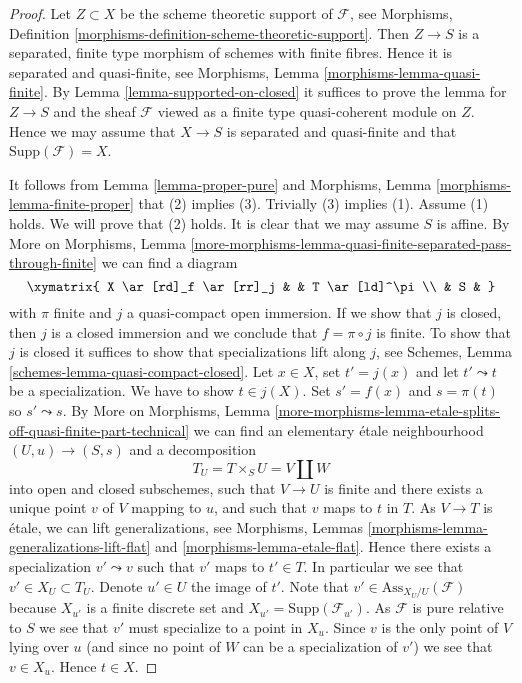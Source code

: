 \begin{proof}
Let $Z \subset X$ be the scheme theoretic support of $\mathcal{F}$, see
Morphisms, Definition \ref{morphisms-definition-scheme-theoretic-support}.
Then $Z \to S$ is a separated, finite type morphism of schemes with
finite fibres. Hence it is separated and quasi-finite, see
Morphisms, Lemma \ref{morphisms-lemma-quasi-finite}.
By
Lemma \ref{lemma-supported-on-closed}
it suffices to prove the lemma for $Z \to S$ and the sheaf $\mathcal{F}$
viewed as a finite type quasi-coherent module on $Z$. Hence we may
assume that $X \to S$ is separated and quasi-finite and that
$\text{Supp}(\mathcal{F}) = X$.

\medskip\noindent
It follows from
Lemma \ref{lemma-proper-pure}
and
Morphisms, Lemma \ref{morphisms-lemma-finite-proper}
that (2) implies (3). Trivially (3) implies (1). Assume (1) holds.
We will prove that (2) holds. It is clear that we may assume $S$ is affine. By
More on Morphisms,
Lemma \ref{more-morphisms-lemma-quasi-finite-separated-pass-through-finite}
we can find a diagram
$$
\xymatrix{
X \ar[rd]_f \ar[rr]_j & & T \ar[ld]^\pi \\
& S &
}
$$
with $\pi$ finite and $j$ a quasi-compact open immersion.
If we show that $j$ is closed, then $j$ is a closed immersion
and we conclude that $f = \pi \circ j$ is finite.
To show that $j$ is closed it suffices to show that specializations
lift along $j$, see
Schemes, Lemma \ref{schemes-lemma-quasi-compact-closed}.
Let $x \in X$, set $t' = j(x)$ and let $t' \leadsto t$ be a specialization.
We have to show $t \in j(X)$. Set $s' = f(x)$ and $s = \pi(t)$ so
$s' \leadsto s$. By
More on Morphisms, Lemma
\ref{more-morphisms-lemma-etale-splits-off-quasi-finite-part-technical}
we can find an elementary \'etale neighbourhood
$(U, u) \to (S, s)$ and a decomposition
$$
T_U = T \times_S U = V \amalg W
$$
into open and closed subschemes, such that $V \to U$ is finite and
there exists a unique point $v$ of $V$ mapping to $u$, and such that
$v$ maps to $t$ in $T$. As $V \to T$ is \'etale, we can lift
generalizations, see
Morphisms, Lemmas \ref{morphisms-lemma-generalizations-lift-flat} and
\ref{morphisms-lemma-etale-flat}.
Hence there exists a specialization $v' \leadsto v$ such that $v'$
maps to $t' \in T$. In particular we see that $v' \in X_U \subset T_U$.
Denote $u' \in U$ the image of $t'$. Note that
$v' \in \text{Ass}_{X_U/U}(\mathcal{F})$ because $X_{u'}$ is a finite
discrete set and $X_{u'} = \text{Supp}(\mathcal{F}_{u'})$.
As $\mathcal{F}$ is pure relative to $S$ we see that $v'$ must
specialize to a point in $X_u$. Since $v$ is the only point of
$V$ lying over $u$ (and since no point of $W$ can be a specialization
of $v'$) we see that $v \in X_u$. Hence $t \in X$.
\end{proof}

